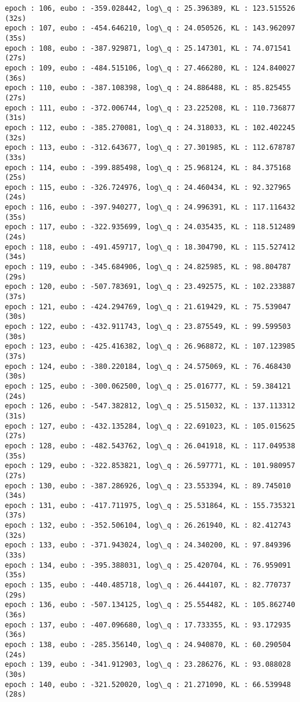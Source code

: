 \documentclass[11pt]{article}
\begin{document}
\begin{Verbatim}[commandchars=\\\{\}]
epoch : 106, eubo : -359.028442, log\_q : 25.396389, KL : 123.515526 (32s)
epoch : 107, eubo : -454.646210, log\_q : 24.050526, KL : 143.962097 (35s)
epoch : 108, eubo : -387.929871, log\_q : 25.147301, KL : 74.071541 (27s)
epoch : 109, eubo : -484.515106, log\_q : 27.466280, KL : 124.840027 (36s)
epoch : 110, eubo : -387.108398, log\_q : 24.886488, KL : 85.825455 (27s)
epoch : 111, eubo : -372.006744, log\_q : 23.225208, KL : 110.736877 (31s)
epoch : 112, eubo : -385.270081, log\_q : 24.318033, KL : 102.402245 (32s)
epoch : 113, eubo : -312.643677, log\_q : 27.301985, KL : 112.678787 (33s)
epoch : 114, eubo : -399.885498, log\_q : 25.968124, KL : 84.375168 (25s)
epoch : 115, eubo : -326.724976, log\_q : 24.460434, KL : 92.327965 (24s)
epoch : 116, eubo : -397.940277, log\_q : 24.996391, KL : 117.116432 (35s)
epoch : 117, eubo : -322.935699, log\_q : 24.035435, KL : 118.512489 (24s)
epoch : 118, eubo : -491.459717, log\_q : 18.304790, KL : 115.527412 (34s)
epoch : 119, eubo : -345.684906, log\_q : 24.825985, KL : 98.804787 (29s)
epoch : 120, eubo : -507.783691, log\_q : 23.492575, KL : 102.233887 (37s)
epoch : 121, eubo : -424.294769, log\_q : 21.619429, KL : 75.539047 (30s)
epoch : 122, eubo : -432.911743, log\_q : 23.875549, KL : 99.599503 (30s)
epoch : 123, eubo : -425.416382, log\_q : 26.968872, KL : 107.123985 (37s)
epoch : 124, eubo : -380.220184, log\_q : 24.575069, KL : 76.468430 (30s)
epoch : 125, eubo : -300.062500, log\_q : 25.016777, KL : 59.384121 (24s)
epoch : 126, eubo : -547.382812, log\_q : 25.515032, KL : 137.113312 (31s)
epoch : 127, eubo : -432.135284, log\_q : 22.691023, KL : 105.015625 (27s)
epoch : 128, eubo : -482.543762, log\_q : 26.041918, KL : 117.049538 (35s)
epoch : 129, eubo : -322.853821, log\_q : 26.597771, KL : 101.980957 (27s)
epoch : 130, eubo : -387.286926, log\_q : 23.553394, KL : 89.745010 (34s)
epoch : 131, eubo : -417.711975, log\_q : 25.531864, KL : 155.735321 (37s)
epoch : 132, eubo : -352.506104, log\_q : 26.261940, KL : 82.412743 (32s)
epoch : 133, eubo : -371.943024, log\_q : 24.340200, KL : 97.849396 (33s)
epoch : 134, eubo : -395.388031, log\_q : 25.420704, KL : 76.959091 (35s)
epoch : 135, eubo : -440.485718, log\_q : 26.444107, KL : 82.770737 (29s)
epoch : 136, eubo : -507.134125, log\_q : 25.554482, KL : 105.862740 (36s)
epoch : 137, eubo : -407.096680, log\_q : 17.733355, KL : 93.172935 (36s)
epoch : 138, eubo : -285.356140, log\_q : 24.940870, KL : 60.290504 (24s)
epoch : 139, eubo : -341.912903, log\_q : 23.286276, KL : 93.088028 (30s)
epoch : 140, eubo : -321.520020, log\_q : 21.271090, KL : 66.539948 (28s)

\end{Verbatim}
\end{document}
